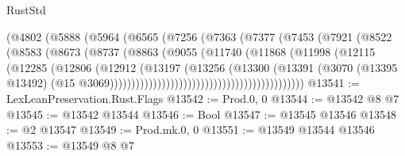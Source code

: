 \begin{lexlean}{RustStd}
\begin{coremodule}
{\begin{coremodule}
{{{{{{{{{{{{{{{{{{{{{{{{{{{{{{{{{{{{{{{                                      (@4802
                                        (@5888
                                          (@5964
                                            (@6565
                                              (@7256
                                                (@7363
                                                  (@7377
                                                    (@7453
                                                      (@7921
                                                        (@8522
                                                          (@8583
                                                            (@8673
                                                              (@8737
                                                                (@8863
                                                                  (@9055
                                                                    (@11740
                                                                      (@11868
                                                                        (@11998
                                                                          (@12115
                                                                            (@12285
                                                                              (@12806
                                                                                (@12912
                                                                                  (@13197
                                                                                    (@13256
                                                                                      (@13300
                                                                                        (@13391
                                                                                          (@3070
                                                                                            (@13395
                                                                                              @13492)
                                                                                            (@15
                                                                                              @3069)))))))))))))))))))))))))))))))))))))))))))))
@13541 := LexLeanPreservation.Rust.Flags
@13542 := Prod.{0, 0}
@13544 := @13542 @8 @7
@13545 := @13542 @13544
@13546 := Bool
@13547 := @13545 @13546
@13548 := @2 @13547
@13549 := Prod.mk.{0, 0}
@13551 := @13549 @13544 @13546
@13553 := @13549 @8 @7
}}}}}}}}}}}}}}}}}}}}}}}}}}}}}}}}}}}}}}}
\end{coremodule}}
\end{coremodule}
\end{lexlean}
